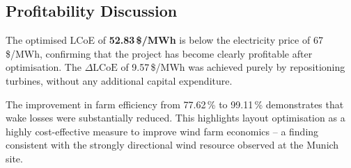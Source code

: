 \documentclass[11pt,a4paper]{article}
\begin{document}
\subsection{Profitability Discussion}

The optimised LCoE of \textbf{52.83\,\$/MWh} is below the electricity price of
67\,\$/MWh, confirming that the project has become clearly profitable after optimisation.
The $\Delta\text{LCoE}$ of 9.57\,\$/MWh was achieved purely by repositioning turbines,
without any additional capital expenditure.

The improvement in farm efficiency from 77.62\,\% to 99.11\,\% demonstrates
that wake losses were substantially reduced. This highlights layout optimisation as a
highly cost-effective measure to improve wind farm economics -- a finding consistent with
the strongly directional wind resource observed at the Munich site.
\end{document}

